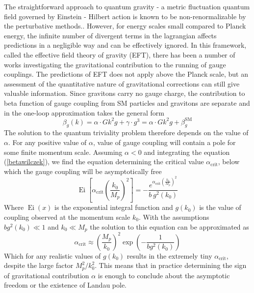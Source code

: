 \documentclass[11pt, a4paper]{article}
\begin{document}
The straightforward approach to quantum gravity - a metric fluctuation quantum field governed by Einstein - Hilbert action
is known to be non-renormalizable by the perturbative methods.\cite{book}. However, for energy scales small
compared to Planck energy, the infinite number of divergent terms in the lagrangian affects predictions in a negligible way and can be effectively ignored.
In this framework, called the effective field theory of gravity (EFT), there has been a number of works investigating
the gravitational contribution to the running of gauge couplings. The predictions of EFT does not apply above
the Planck scale, but an assessment of the quantitative nature of gravitational corrections can still give valuable information.
Since gravitons carry no gauge charge, the contribution to beta function of gauge coupling from SM particles and gravitons are separate
and in the one-loop approximation takes the general form
\begin{equation}
    \beta_g(k) = \alpha \cdot G k^2 g + \gamma \cdot g^3 = \alpha \cdot G k^2 g + \beta_{g}^{\text{SM}}
    \label{betawilczek}
\end{equation}
The solution to the quantum triviality problem therefore depends on the value of $\alpha$.
For any positive value of $\alpha$, value of gauge coupling will contain a pole for some finite momentum scale.
Assuming $\alpha < 0$ and integrating the equation (\ref{betawilczek}), we find the equation determining the critical value $\alpha_{\text{crit}}$, below which the gauge coupling will be asymptotically free
\begin{equation}
\operatorname{Ei}\left[\alpha_{\text{crit}} \left( \frac{k_0}{M_p} \right)^2 \right]
    = - \frac{e^{\alpha_{\text{crit}} \left( \frac{k_0}{M_p} \right)^2}}{b \ g^2(k_0)}%
\end{equation}
Where $\operatorname{Ei}(x)$ is the exponential integral function and $g(k_0)$ is the value of coupling observed at the momentum scale $k_0$. With the assumptions $b g^2(k_0) \ll 1$ and $k_0 \ll M_p$ the solution to this equation can be approximated as
\begin{equation}
    \alpha_{\text{crit}} \approx \left( \frac{M_p}{k_0} \right)^2 \operatorname{exp}{\left( - \frac{1}{b g^2(k_0)} \right)}
\end{equation}
Which for any realistic values of $g(k_0)$ results in the extremely tiny $\alpha_{\text{crit}}$, despite the large factor $M_p^2/k_0^2$.
This means that in practice determining the sign of gravitational contribution $\alpha$ is enough to conclude about the asymptotic freedom or the existence of Landau pole.
\end{document}
